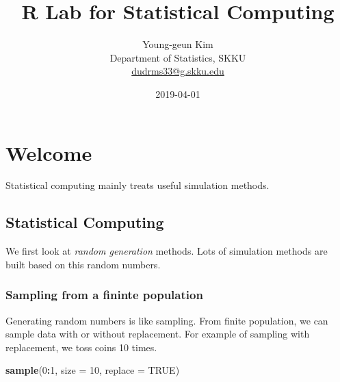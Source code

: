 \documentclass[]{book}
\title{R Lab for Statistical Computing}
\author{Young-geun Kim\\
Department of Statistics, SKKU\\
\href{mailto: dudrms33@g.skku.edu}{dudrms33@g.skku.edu}}
\date{2019-04-01}
\newenvironment{Shaded}{\begin{snugshade}}{\end{snugshade}}
\newcommand{\KeywordTok}[1]{\textcolor[rgb]{0.13,0.29,0.53}{\textbf{#1}}}
\newcommand{\DataTypeTok}[1]{\textcolor[rgb]{0.13,0.29,0.53}{#1}}
\newcommand{\DecValTok}[1]{\textcolor[rgb]{0.00,0.00,0.81}{#1}}
\newcommand{\OtherTok}[1]{\textcolor[rgb]{0.56,0.35,0.01}{#1}}
\newcommand{\OperatorTok}[1]{\textcolor[rgb]{0.81,0.36,0.00}{\textbf{#1}}}
\newcommand{\NormalTok}[1]{#1}
\let\oldmaketitle\maketitle
\theoremstyle{definition}
\theoremstyle{definition}
\theoremstyle{definition}
\theoremstyle{remark}
\begin{document}
\maketitle

\begin{titlepage}
  
\end{titlepage}

\let\maketitle\oldmaketitle
\maketitle

{
\setcounter{tocdepth}{1}
\tableofcontents
}
\chapter*{Welcome}\label{welcome}

 Statistical computing mainly treats useful simulation methods.

\section*{Statistical Computing}\label{statistical-computing}

We first look at \emph{random generation} methods. Lots of simulation
methods are built based on this random numbers.

\subsection*{Sampling from a fininte
population}\label{sampling-from-a-fininte-population}

Generating random numbers is like sampling. From finite population, we
can sample data with or without replacement. For example of sampling
with replacement, we toss coins 10 times.

\begin{Shaded}
\begin{Highlighting}[]
\KeywordTok{sample}\NormalTok{(}\DecValTok{0}\OperatorTok{:}\DecValTok{1}\NormalTok{, }\DataTypeTok{size =} \DecValTok{10}\NormalTok{, }\DataTypeTok{replace =} \OtherTok{TRUE}\NormalTok{)}
\end{Highlighting}
\end{Shaded}
\end{document}
